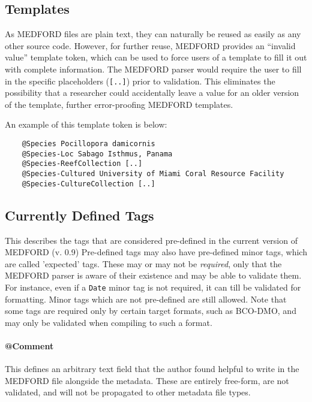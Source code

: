 \documentclass[10pt]{article}
\newcommand{\version}{0.9}
\begin{document}
\subsection{Templates} \label{templates}

As MEDFORD files are plain text, they can naturally be reused as easily as any other source code.
However, for further reuse, MEDFORD provides an ``invalid value'' template token, which can be used to force users of a template to fill it out with complete information. The MEDFORD parser would require the user to fill in the specific placeholders (\texttt{[..]}) prior to validation. This eliminates the possibility that a researcher could accidentally leave a value for an older version of the template, further error-proofing MEDFORD templates.

An example of this template token is below:

\begin{verbatim}
    @Species Pocillopora damicornis
    @Species-Loc Sabago Isthmus, Panama
    @Species-ReefCollection [..]
    @Species-Cultured University of Miami Coral Resource Facility
    @Species-CultureCollection [..]
\end{verbatim}

    
\subsection{Currently Defined Tags}
\label{tags}
    
    This describes the tags that are considered pre-defined in the current version of MEDFORD (v. \version)
    Pre-defined tags may also have pre-defined minor tags, which are called 'expected' tags. These may or may not be \textit{required}, only that the MEDFORD parser is aware of their existence and may be able to validate them. For instance, even if a \texttt{Date} minor tag is not required, it can till be validated for formatting. Minor tags which are not pre-defined are still allowed.
    Note that some tags are required only by certain target formats, such as BCO-DMO, and may only be validated when compiling to such a format.
    
    \paragraph{@Comment}
    
    This defines an arbitrary text field that the author found helpful to write in the MEDFORD file alongside the metadata. These are entirely free-form, are not validated, and will not be propagated to other metadata file types.
    
\end{document}

